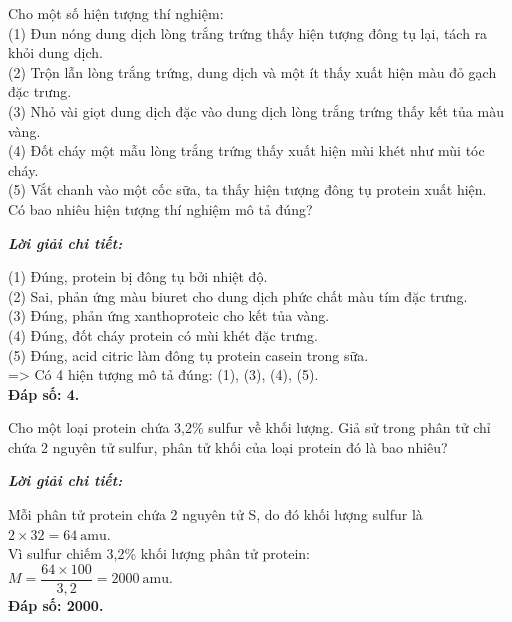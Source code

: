 \documentclass[11pt,a4paper]{article}
\def\loigiai#1{
\par\begingroup\color{blue!80!black}\small
\noindent\textbf{\textit{Lời giải chi tiết:}}\par
#1\par\endgroup}
\begin{document}
\begin{ex}
Cho một số hiện tượng thí nghiệm:\\
(1) Đun nóng dung dịch lòng trắng trứng thấy hiện tượng đông tụ lại, tách ra khỏi dung dịch.\\
(2) Trộn lẫn lòng trắng trứng, dung dịch  và một ít  thấy xuất hiện màu đỏ gạch đặc trưng.\\
(3) Nhỏ vài giọt dung dịch  đặc vào dung dịch lòng trắng trứng thấy kết tủa màu vàng.\\
(4) Đốt cháy một mẫu lòng trắng trứng thấy xuất hiện mùi khét như mùi tóc cháy.\\
(5) Vắt chanh vào một cốc sữa, ta thấy hiện tượng đông tụ protein xuất hiện.\\
Có bao nhiêu hiện tượng thí nghiệm mô tả đúng?
\loigiai{
(1) Đúng, protein bị đông tụ bởi nhiệt độ.\\
(2) Sai, phản ứng màu biuret cho dung dịch phức chất màu tím đặc trưng.\\
(3) Đúng, phản ứng xanthoproteic cho kết tủa vàng.\\
(4) Đúng, đốt cháy protein có mùi khét đặc trưng.\\
(5) Đúng, acid citric làm đông tụ protein casein trong sữa.\\
=> Có 4 hiện tượng mô tả đúng: (1), (3), (4), (5).\\
\textbf{Đáp số: 4.}}
\end{ex}


\begin{ex}
Cho một loại protein chứa 3,2\% sulfur về khối lượng. Giả sử trong phân tử chỉ chứa 2 nguyên tử sulfur, phân tử khối của loại protein đó là bao nhiêu?
\loigiai{
Mỗi phân tử protein chứa 2 nguyên tử S, do đó khối lượng sulfur là $2 \times 32 = 64\ \text{amu}$.\\
Vì sulfur chiếm 3,2\% khối lượng phân tử protein:\\
$M = \dfrac{64 \times 100}{3{,}2} = 2000\ \text{amu}$.\\
\textbf{Đáp số: 2000.}}
\end{ex}
\end{document}
